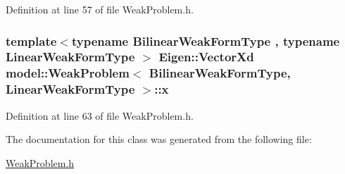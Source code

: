 Definition at line 57 of file Weak\+Problem.\+h.

\hypertarget{classmodel_1_1_weak_problem_ada469fc18740b2590630205adc41d9ee}{}
\subsubsection[{x}]{\setlength{\rightskip}{0pt plus 5cm}template$<$typename Bilinear\+Weak\+Form\+Type , typename Linear\+Weak\+Form\+Type $>$ Eigen\+::\+Vector\+Xd {\bf model\+::\+Weak\+Problem}$<$ Bilinear\+Weak\+Form\+Type, Linear\+Weak\+Form\+Type $>$\+::x}\label{classmodel_1_1_weak_problem_ada469fc18740b2590630205adc41d9ee}


Definition at line 63 of file Weak\+Problem.\+h.



The documentation for this class was generated from the following file\+:\begin{DoxyCompactItemize}
\item 
\hyperlink{_weak_problem_8h}{Weak\+Problem.\+h}\end{DoxyCompactItemize}
